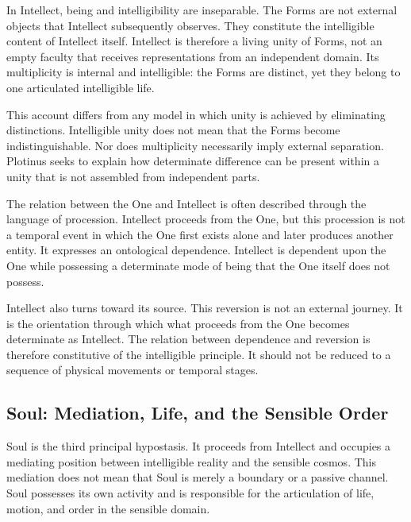 \label{para:VS.B01.P01.C08.S06.SS03.P002}
In Intellect, being and intelligibility are inseparable. The Forms are
not external objects that Intellect subsequently observes. They
constitute the intelligible content of Intellect itself. Intellect is
therefore a living unity of Forms, not an empty faculty that receives
representations from an independent domain. Its multiplicity is
internal and intelligible: the Forms are distinct, yet they belong to
one articulated intelligible life.

\label{para:VS.B01.P01.C08.S06.SS03.P003}
This account differs from any model in which unity is achieved by
eliminating distinctions. Intelligible unity does not mean that the
Forms become indistinguishable. Nor does multiplicity necessarily
imply external separation. Plotinus seeks to explain how determinate
difference can be present within a unity that is not assembled from
independent parts.

\label{para:VS.B01.P01.C08.S06.SS03.P004}
The relation between the One and Intellect is often described through
the language of procession. Intellect proceeds from the One, but this
procession is not a temporal event in which the One first exists alone
and later produces another entity. It expresses an ontological
dependence. Intellect is dependent upon the One while possessing a
determinate mode of being that the One itself does not possess.

\label{para:VS.B01.P01.C08.S06.SS03.P005}
Intellect also turns toward its source. This reversion is not an
external journey. It is the orientation through which what proceeds
from the One becomes determinate as Intellect. The relation between
dependence and reversion is therefore constitutive of the intelligible
principle. It should not be reduced to a sequence of physical
movements or temporal stages.

\subsection{Soul: Mediation, Life, and the Sensible Order}
\label{subsec:ch08-plotinus-soul}

\label{para:VS.B01.P01.C08.S06.SS04.P001}
Soul is the third principal hypostasis. It proceeds from Intellect
and occupies a mediating position between intelligible reality and
the sensible cosmos. This mediation does not mean that Soul is merely
a boundary or a passive channel. Soul possesses its own activity and
is responsible for the articulation of life, motion, and order in
the sensible domain.

